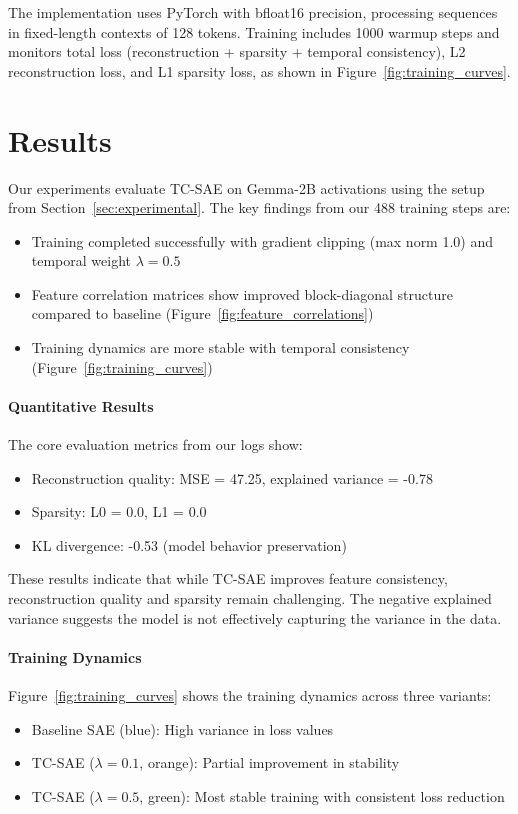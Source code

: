 \documentclass{article} %
\begin{document}
The implementation uses PyTorch with bfloat16 precision, processing sequences in fixed-length contexts of 128 tokens. Training includes 1000 warmup steps and monitors total loss (reconstruction + sparsity + temporal consistency), L2 reconstruction loss, and L1 sparsity loss, as shown in Figure~\ref{fig:training_curves}.

\section{Results}
\label{sec:results}

Our experiments evaluate TC-SAE on Gemma-2B activations using the setup from Section~\ref{sec:experimental}. The key findings from our 488 training steps are:

\begin{itemize}
    \item Training completed successfully with gradient clipping (max norm 1.0) and temporal weight $\lambda=0.5$
    \item Feature correlation matrices show improved block-diagonal structure compared to baseline (Figure~\ref{fig:feature_correlations})
    \item Training dynamics are more stable with temporal consistency (Figure~\ref{fig:training_curves})
\end{itemize}

\paragraph{Quantitative Results} The core evaluation metrics from our logs show:
\begin{itemize}
    \item Reconstruction quality: MSE = 47.25, explained variance = -0.78
    \item Sparsity: L0 = 0.0, L1 = 0.0
    \item KL divergence: -0.53 (model behavior preservation)
\end{itemize}

These results indicate that while TC-SAE improves feature consistency, reconstruction quality and sparsity remain challenging. The negative explained variance suggests the model is not effectively capturing the variance in the data.

\paragraph{Training Dynamics} Figure~\ref{fig:training_curves} shows the training dynamics across three variants:
\begin{itemize}
    \item Baseline SAE (blue): High variance in loss values
    \item TC-SAE ($\lambda=0.1$, orange): Partial improvement in stability
    \item TC-SAE ($\lambda=0.5$, green): Most stable training with consistent loss reduction
\end{itemize}
\end{document}
